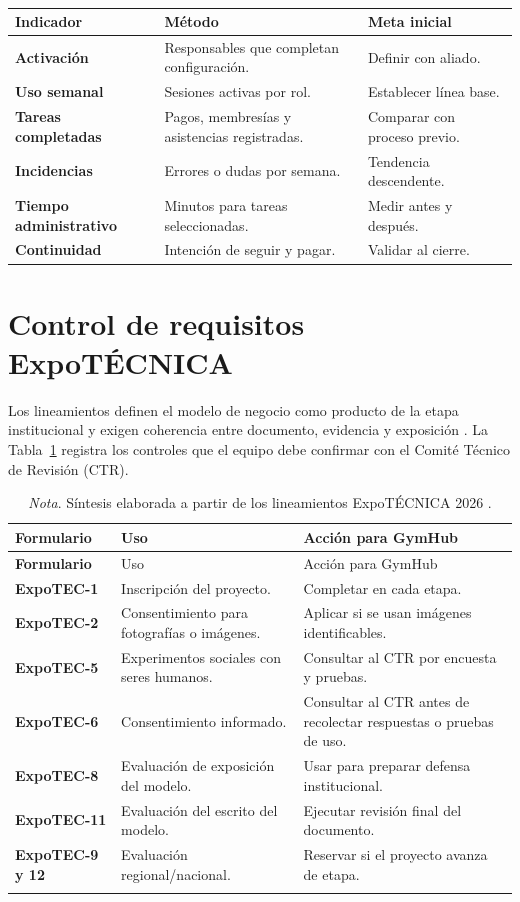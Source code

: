 \begin{table}[H]
\caption{Indicadores propuestos para un piloto}
\begin{tabularx}{\textwidth}{>{\bfseries}p{4cm}X p{3cm}}
\toprule
Indicador & Método & Meta inicial \\
\midrule
Activación & Responsables que completan configuración. & Definir con aliado. \\
Uso semanal & Sesiones activas por rol. & Establecer línea base. \\
Tareas completadas & Pagos, membresías y asistencias registradas. & Comparar con proceso previo. \\
Incidencias & Errores o dudas por semana. & Tendencia descendente. \\
Tiempo administrativo & Minutos para tareas seleccionadas. & Medir antes y después. \\
Continuidad & Intención de seguir y pagar. & Validar al cierre. \\
\bottomrule
\end{tabularx}
\caption*{\fuentepropia}
\end{table}

\section{Control de requisitos ExpoTÉCNICA}

Los lineamientos definen el modelo de negocio como producto de la etapa
institucional y exigen coherencia entre documento, evidencia y exposición
\parencite{mep2026}. La Tabla~\ref{tab:formularios} registra los controles que el
equipo debe confirmar con el Comité Técnico de Revisión (CTR).

\begin{longtable}{>{\bfseries}p{2.4cm}p{6cm}p{5.6cm}}
\caption{Control de formularios ExpoTEC}\label{tab:formularios}\\
\toprule
Formulario & Uso & Acción para GymHub \\
\midrule
\endfirsthead
\toprule
Formulario & Uso & Acción para GymHub \\
\midrule
\endhead
ExpoTEC-1 & Inscripción del proyecto. & Completar en cada etapa. \\
ExpoTEC-2 & Consentimiento para fotografías o imágenes. & Aplicar si se usan imágenes identificables. \\
ExpoTEC-5 & Experimentos sociales con seres humanos. & Consultar al CTR por encuesta y pruebas. \\
ExpoTEC-6 & Consentimiento informado. & Consultar al CTR antes de recolectar respuestas o pruebas de uso. \\
ExpoTEC-8 & Evaluación de exposición del modelo. & Usar para preparar defensa institucional. \\
ExpoTEC-11 & Evaluación del escrito del modelo. & Ejecutar revisión final del documento. \\
ExpoTEC-9 y 12 & Evaluación regional/nacional. & Reservar si el proyecto avanza de etapa. \\
\bottomrule
\caption*{\textit{Nota}. Síntesis elaborada a partir de los lineamientos ExpoTÉCNICA 2026 \parencite{mep2026}.}
\end{longtable}


